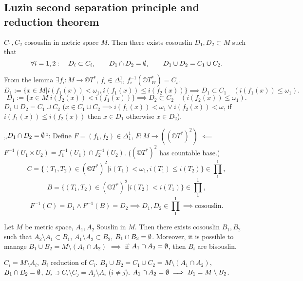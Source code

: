 \documentclass[12pt]{article}					%
\begin{document}
\subsection{Luzin second separation principle and reduction theorem}
\begin{veta}
	$C_1, C_2$ cosouslin in metric space $M$. Then there exists cosouslin $D_1, D_2 \subset M$ such that
	$$ \forall i = 1, 2: \quad D_i \subset C_i, \qquad D_1 \cap D_2 = \emptyset, \qquad D_1 \cup D_2 = C_1 \cup C_2. $$

	\begin{dukazin}
		From the lemma $\exists f_i: M \rightarrow ©T^*$, $f_i \in Δ_1^1$, $f_i^{-1}(©T_W^*) = C_i$.
		$$ D_1 := \{x \in M | i(f_1(x)) < ω_1, i(f_1(x)) ≤ i(f_2(x))\} \implies D_1 \subset C_1 \quad (i(f_1(x)) ≤ ω_1). $$
		$$ D_1 := \{x \in M | i(f_2(x)) < i(f_1(x))\} \implies D_2 \subset C_2 \quad (i(f_2(x)) ≤ ω_1). $$
		$D_1 \cup D_2 = C_1 \cup C_2$ ($x \in C_1 \cup C_2 \implies i(f_1(x)) < ω_1 \lor i(f_2(x)) < ω$, if $i(f_1(x)) ≤ i(f_2(x))$ then $x \in D_1$ otherwise $x \in D_2$).

		„$D_1 \cap D_2 = \emptyset$“: Define $F = (f_1, f_2) \in Δ_1^1$, $F: M \rightarrow ((©T^*)^2)$ $\impliedby$ $F^{-1}(U_1 \times U_2) = f_1^{-1}(U_1) \cap f_2^{-1}(U_2)$. ($(©T^*)^2$ has countable base.)
		$$ C = \{(T_1, T_2) \in (©T^*)^2 | i(T_1) < ω_1, i(T_1) ≤ i(T_2)\} \in ∏_1^1, $$
		$$ B = \{(T_1, T_2) \in (©T^*)^2 | i(T_2) < i(T_1)\} \in ∏_1^1, $$
		$$ F^{-1}(C) = D_1 \land F^{-1}(B) = D_2 \implies D_1, D_2 \in ∏_1^1 \implies \text{cosouslin}. $$

	\end{dukazin}
\end{veta}

\begin{dusledek}
	Let $M$ be metric space, $A_1, A_2$ Souslin in $M$. Then there exists cosouslin $B_1, B_2$ such that $A_2 \setminus A_1 \subset B_1$, $A_1 \setminus A_2 \subset B_2$, $B_1 \cap B_2 = \emptyset$. Moreover, it is possible to manage $B_1 \cup B_2 = M \setminus (A_1 \cap A_2)$ $\implies$ if $A_1 \cap A_2 = \emptyset$, then $B_i$ are bisouslin.

	\begin{dukazin}
		$C_i = M \setminus A_i$, $B_i$ reduction of $C_i$. $B_1 \cup B_2 = C_1 \cup C_2 = M \setminus (A_1 \cap A_2)$, $B_1 \cap B_2 = \emptyset$, $B_i \supset C_i \setminus C_j = A_j \setminus A_i$ ($i ≠ j$). $A_1 \cap A_2 = \emptyset \implies B_1 = M \setminus B_2$.
	\end{dukazin}
\end{dusledek}
\end{document}
